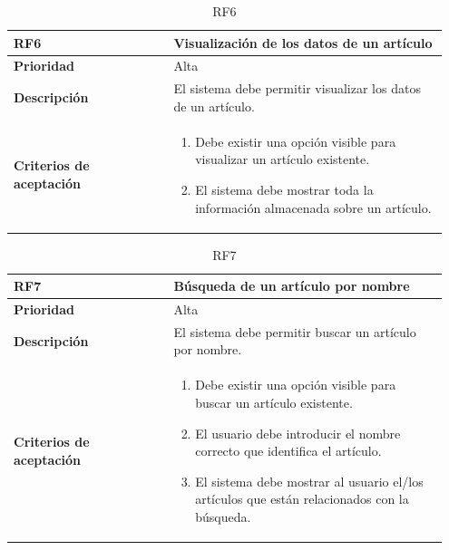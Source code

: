\begin{table}[htb!]
	\centering %
	\begin{tabular}{|p{0.35\linewidth}|p{0.6\linewidth}|}
		\hline
		\rowcolor{grayshade} \textbf{RF6} & \textbf{Visualización de los datos de un artículo} \\
		\hline
		\textbf{Prioridad} & Alta \\
		\hline
		\textbf{Descripción} & El sistema debe permitir visualizar los datos de un artículo.\\
		\hline
		\vspace{0.5mm}
		\textbf{Criterios de aceptación} & 
		\begin{minipage}[t]{0.9\linewidth}
			\begin{enumerate}
				\item Debe existir una opción visible para visualizar un artículo existente.
				\item El sistema debe mostrar toda la información almacenada sobre un artículo. 
			\end{enumerate}
			\vspace{2mm}
		\end{minipage} \\
		\hline
	\end{tabular}
	\caption{RF6}
\end{table}

\begin{table}[htb!]
	\centering %
	\begin{tabular}{|p{0.35\linewidth}|p{0.6\linewidth}|}
		\hline
		\rowcolor{grayshade} \textbf{RF7} & \textbf{Búsqueda de un artículo por nombre} \\
		\hline
		\textbf{Prioridad} & Alta \\
		\hline
		\textbf{Descripción} & El sistema debe permitir buscar un artículo por nombre.\\
		\hline
		\vspace{0.5mm}
		\textbf{Criterios de aceptación} & 
		\begin{minipage}[t]{0.9\linewidth}
			\begin{enumerate}
				\item Debe existir una opción visible para buscar un artículo existente.
				\item El usuario debe introducir el nombre correcto que identifica el artículo. 
				\item El sistema debe mostrar al usuario el/los artículos que están relacionados con la búsqueda. 
			\end{enumerate}
			\vspace{2mm}
		\end{minipage} \\
		\hline
	\end{tabular}
	\caption{RF7}
\end{table}


